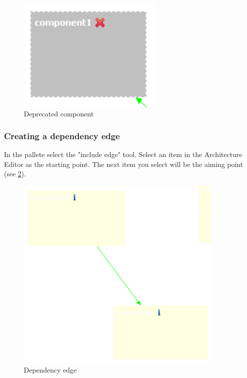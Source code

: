\begin{figure}[h!]
\begin{center}
\includegraphics[width=7cm]{deprecated.png}
   \caption{Deprecated component}
\label{deprecated}
\end{center}
\end{figure}\par



\subsubsection{Creating a dependency edge}

In the pallete select the "include edge" tool. Select an item in the Architecture Editor
as the starting point. The next item you select will be the aiming point (see \ref{include}).

\begin{figure}[h!]
\begin{center}
\includegraphics[width=10cm]{include.png}
   \caption{Dependency edge}
\label{include}
\end{center}
\end{figure}\par


